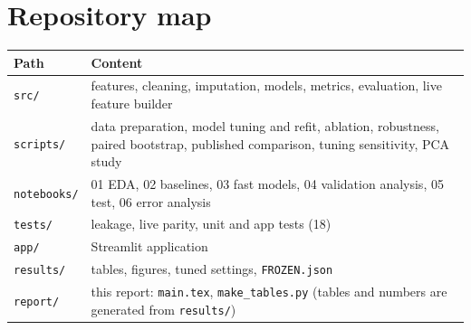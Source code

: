 \documentclass[11pt,a4paper]{article}
\newcommand{\code}[1]{\texttt{#1}}
\begin{document}
\section{Repository map}
\begin{table}[H]\centering\small
\begin{tabular}{@{}lp{11.5cm}@{}}
\toprule
Path & Content \\
\midrule
\code{src/} & features, cleaning, imputation, models, metrics, evaluation, live feature builder \\
\code{scripts/} & data preparation, model tuning and refit, ablation, robustness, paired bootstrap, published comparison, tuning sensitivity, PCA study \\
\code{notebooks/} & 01 EDA, 02 baselines, 03 fast models, 04 validation analysis, 05 test, 06 error analysis \\
\code{tests/} & leakage, live parity, unit and app tests (18) \\
\code{app/} & Streamlit application \\
\code{results/} & tables, figures, tuned settings, \code{FROZEN.json} \\
\code{report/} & this report: \code{main.tex}, \code{make\_tables.py} (tables and numbers are generated from \code{results/}) \\
\bottomrule
\end{tabular}
\end{table}
\end{document}
